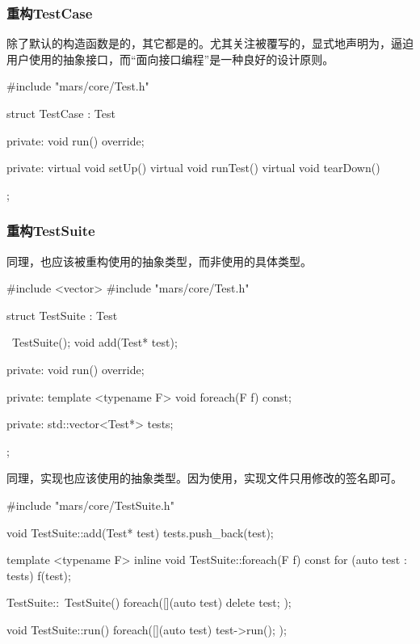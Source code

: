 \begin{content}
\subsubsection{重构TestCase}

除了默认的构造函数是的，其它都是的。尤其关注被覆写的，显式地声明为，逼迫用户使用的抽象接口，而“面向接口编程”是一种良好的设计原则。

\begin{leftbar}
 \begin{c++}[caption={\ttfamily{include/mars/core/TestCase.h}}]
#include "mars/core/Test.h"

struct TestCase : Test {
private:
  void run() override;

private:
  virtual void setUp() {}
  virtual void runTest() {}
  virtual void tearDown() {}
};
 \end{c++}
\end{leftbar}

\subsubsection{重构TestSuite}

同理，也应该被重构使用的抽象类型，而非使用的具体类型。

\begin{leftbar}
 \begin{c++}[caption={\ttfamily{include/mars/core/TestSuite.h}}]
#include <vector>
#include "mars/core/Test.h"

struct TestSuite : Test {
  ~TestSuite();
  void add(Test* test);

private:
  void run() override;

private:
  template <typename F>
  void foreach(F f) const;

private:
  std::vector<Test*> tests;
};
 \end{c++}
\end{leftbar}

同理，实现也应该使用的抽象类型。因为使用，实现文件只用修改的签名即可。

\begin{leftbar}
 \begin{c++}[caption={\ttfamily{src/mars/core/TestSuite.cc}}]
#include "mars/core/TestSuite.h"

void TestSuite::add(Test* test) {
  tests.push_back(test);
}

template <typename F>
inline void TestSuite::foreach(F f) const {
  for (auto test : tests) {
    f(test);
  }
}

TestSuite::~TestSuite() {
  foreach([](auto test) {
    delete test;
  });
}

void TestSuite::run() {
  foreach([](auto test) {
    test->run();
  });
}
 \end{c++}
\end{leftbar}

\end{content}

